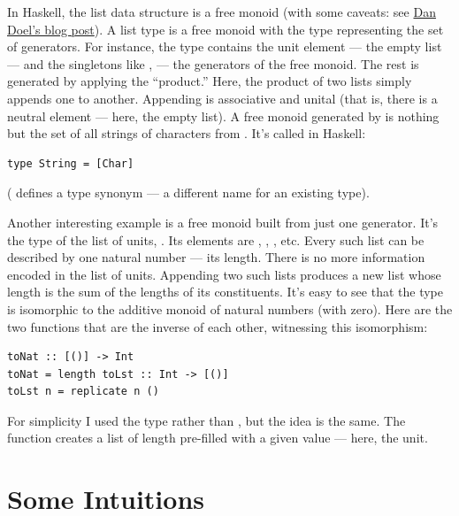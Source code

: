 In Haskell, the list data structure is a free monoid (with some caveats:
see \href{http://comonad.com/reader/2015/free-monoids-in-haskell/}{Dan
Doel's blog post}). A list type \code{{[}a{]}} is a free monoid with
the type  representing the set of generators. For instance,
the type \code{{[}Char{]}} contains the unit element --- the empty
list \code{{[}{]}} --- and the singletons like
,  --- the
generators of the free monoid. The rest is generated by applying the
``product.'' Here, the product of two lists simply appends one to
another. Appending is associative and unital (that is, there is a
neutral element --- here, the empty list). A free monoid generated by
 is nothing but the set of all strings of characters from
. It's called  in Haskell:

\begin{verbatim}
type String = [Char]
\end{verbatim}

( defines a type synonym --- a different name for an
existing type).

Another interesting example is a free monoid built from just one
generator. It's the type of the list of units, \code{{[}(){]}}. Its
elements are \code{{[}{]}}, \code{{[}(){]}}, \code{{[}(),\ (){]}},
etc. Every such list can be described by one natural number --- its
length. There is no more information encoded in the list of units.
Appending two such lists produces a new list whose length is the sum of
the lengths of its constituents. It's easy to see that the type
\code{{[}(){]}} is isomorphic to the additive monoid of natural
numbers (with zero). Here are the two functions that are the inverse of
each other, witnessing this isomorphism:

\begin{verbatim}
toNat :: [()] -> Int
toNat = length toLst :: Int -> [()]
toLst n = replicate n ()
\end{verbatim}

For simplicity I used the type  rather than
, but the idea is the same. The function
 creates a list of length  pre-filled with a
given value --- here, the unit.

\section{Some Intuitions}\label{some-intuitions}

